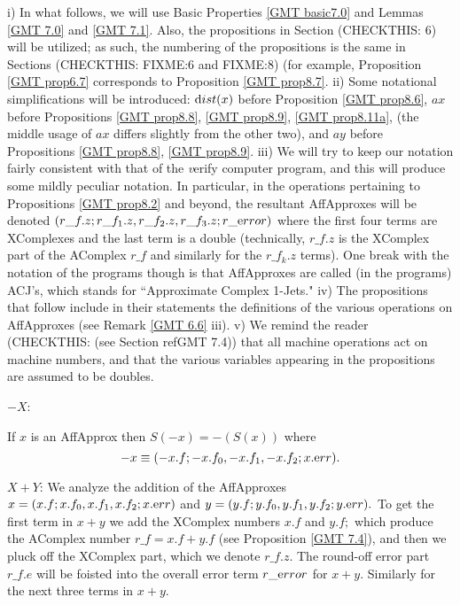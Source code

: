 \begin{conventions}\label{GMT 8.3}
i)  In what follows, we will use Basic Properties \ref{GMT basic7.0} and Lemmas \ref{GMT 7.0} and \ref{GMT 7.1}.  Also, the propositions in
	Section (CHECKTHIS: 6)  %
will be utilized;  as such, the numbering of the propositions is the same in
	Sections (CHECKTHIS: FIXME:6 and FIXME:8)  %
(for example, Proposition \ref{GMT prop6.7} corresponds to Proposition \ref{GMT prop8.7}.  
	ii)  Some notational simplifications will be introduced: ${\textrm dist}(x)$ before Proposition \ref{GMT prop8.6}, $ax$ before Propositions \ref{GMT prop8.8}, \ref{GMT prop8.9}, \ref{GMT prop8.11a}, 
	(the middle usage of $ax$ differs slightly from the other two), and $ay$ before Propositions \ref{GMT prop8.8}, \ref{GMT prop8.9}.
	iii)  We will try to keep our notation fairly consistent with that of the {\textit verify} computer program, and this will produce some mildly peculiar notation.  In particular, in the operations pertaining to Propositions \ref{GMT prop8.2} and beyond, the resultant AffApproxes will be denoted $(r\_f.z; r\_f_1.z, r\_f_2.z, 
r\_f_3.z; r\_{\textrm error})$
where the first four terms are XComplexes and the last term is a double (technically, $r\_f.z$ is the XComplex part of the AComplex  $r\_f$ and similarly for the $r\_f_k.z$ terms).  One break with the notation of the programs though is that AffApproxes are called (in the programs) ACJ's, which stands for ``Approximate Complex 1-Jets."
iv) The propositions that follow include in their statements the definitions of the various operations on AffApproxes (see Remark
	\ref{GMT 6.6} iii).
	v)  We remind the reader
	(CHECKTHIS: (see Section ref{GMT 7.4}))  %
	that all machine operations act on machine numbers, and that the 
various variables appearing in the propositions are assumed to be doubles.
\end{conventions}

$-X$:

\begin{proposition}\label{GMT prop8.1}
If $x$ is an AffApprox 
then $S(-x) = -(S(x))$ where
$$-x \equiv (-x.f; -x.f_0,-x.f_1,-x.f_2; x.{\textrm err}).$$ \end{proposition}


$X+Y$:
We analyze the addition of the  {\textrm AffApproxes} 
 $x = (x.f; x.f_0,x.f_1, x.f_2; x.{\textrm err})$  and 
$y = (y.f; y.f_0,y.f_1,y.f_2; y.{\textrm err}).$  To get the first term in $x+y$ we add the XComplex numbers $x.f$ and $y.f;$ which
produce the AComplex number $r\_f = x.f + y.f$ (see Proposition \ref{GMT 7.4}), and then we pluck off the XComplex part,
which we denote $r\_f.z.$  The round-off error part $r\_f.e$ will be foisted into the overall error term $r\_{\textrm error}$
for $x+y.$ Similarly for the next three terms in $x + y.$


